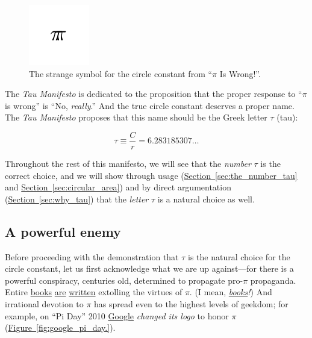 \documentclass{article}
\begin{document}
\begin{figure}
\begin{center}
\includegraphics{images/figures/palais-tau.png}
\end{center}
\caption{The strange symbol for the circle constant from ``$\pi$ Is Wrong!''.\label{fig:palais_tau}}
\end{figure}

The \emph{Tau Manifesto} is dedicated to the proposition that the proper response to ``$\pi$ is wrong'' is ``No, \emph{really}.'' And the true circle constant deserves a proper name. The \emph{Tau Manifesto} proposes that this name should be the Greek letter $\tau$ (tau):

\[
  \tau \equiv \frac{C}{r} = 6.283185307\ldots
\]

Throughout the rest of this manifesto, we will see that the \emph{number} $\tau$ is the correct choice, and we will show through usage (\hyperref[sec:the_number_tau]{Section~}\ref{sec:the_number_tau} and \hyperref[sec:circular_area]{Section~}\ref{sec:circular_area}) and by direct argumentation (\hyperref[sec:why_tau]{Section~}\ref{sec:why_tau}) that the \emph{letter} $\tau$ is a natural choice as well.

 \subsection{A powerful enemy} %

Before proceeding with the demonstration that $\tau$ is the natural choice for the circle constant, let us first acknowledge what we are up against---for there is a powerful conspiracy, centuries old, determined to propagate pro-$\pi$ propaganda. Entire \href{http://www.amazon.com/exec/obidos/ISBN=0802713327/parallaxproductiA/}{books} \href{http://www.amazon.com/Pi-Sky-Counting-Thinking-Being/dp/0198539568}{are} \href{http://www.amazon.com/exec/obidos/ISBN=0312381859/parallaxproductiA/}{written} extolling the virtues of $\pi$. (I mean, \href{http://www.amazon.com/exec/obidos/ISBN=0387989463/parallaxproductiA/}{\emph{books}}\emph{!}) And irrational devotion to $\pi$ has spread even to the highest levels of geekdom; for example, on ``Pi Day'' 2010 \href{http://www.google.com/}{Google} \emph{changed its logo} to honor $\pi$  (\hyperref[fig:google_pi_day.]{Figure~}\ref{fig:google_pi_day.}).  
\end{document}
